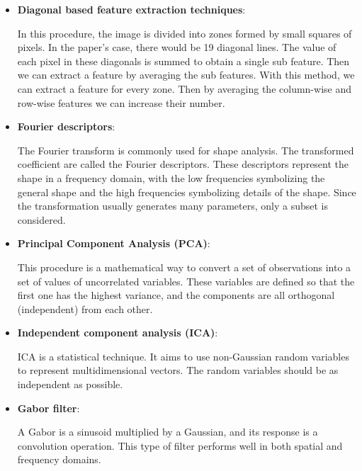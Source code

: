 \documentclass[conference]{IEEEtran}
\begin{document}
					\begin{itemize}
					
						\item \textbf{Diagonal based feature extraction techniques}:
						
							In this procedure, the image is divided into zones formed by small squares of pixels. 
							In the paper's case, there would be 19 diagonal lines. 
							The value of each pixel in these diagonals is summed to obtain a single sub feature. 
							Then we can extract a feature by averaging the sub features. 
							With this method, we can extract a feature for every zone. 
							Then by averaging the column-wise and row-wise features we can increase their number. 
							
						
						\item \textbf{Fourier descriptors}:
						
							The Fourier transform is commonly used for shape analysis. 
							The transformed coefficient are called the Fourier descriptors.
							These descriptors represent the shape in a frequency domain, with the low frequencies symbolizing the general shape and the high frequencies symbolizing details of the shape. 
							Since the transformation usually generates many parameters, only a subset is considered.
						
						
						\item \textbf{Principal Component Analysis (PCA)}:
						
							This procedure is a mathematical way to convert a set of observations into a set of values of uncorrelated variables. 
							These variables are defined so that the first one has the highest variance, and the components are all orthogonal (independent) from each other. 
							
						\item \textbf{Independent component analysis (ICA)}:
						
							ICA is a statistical technique. 
							It aims to use non-Gaussian random variables to represent multidimensional vectors. 
							The random variables should be as independent as possible. 
						
						\item \textbf{Gabor filter}:
						
							A Gabor is a sinusoid multiplied by a Gaussian, and its response is a convolution operation. 
							This type of filter performs well in both spatial and frequency domains.
						
					\end{itemize}
				
\end{document}
